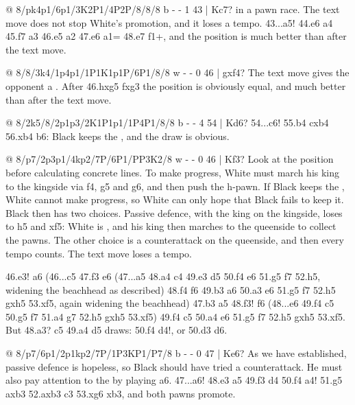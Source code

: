 @ 8/pk4p1/6p1/3K2P1/4P2P/8/8/8 b - - 1 43 | Kc7?
 in a pawn race.
The text move does not stop White's promotion, and it loses a tempo. 43...a5! 44.\K e6 a4 45.\K f7 a3
46.e5 a2 47.e6 a1=\Q{} 48.e7 \Q f1+, and the position is much better than after the text move.

@ 8/8/3k4/1p4p1/1P1K1p1P/6P1/8/8 w - - 0 46 | gxf4?
The text move gives the opponent a .
After 46.hxg5 fxg3 the position is obviously equal, and much better than after the text
move.

@ 8/2k5/8/2p1p3/2K1P1p1/1P4P1/8/8 b - - 4 54 | Kd6?
54...\K c6! 55.b4 cxb4 56.\K xb4 \K b6: Black keeps the ,
and the draw is obvious.

@ 8/p7/2p3p1/4kp2/7P/6P1/PP3K2/8 w - - 0 46 | Kf3?
Look at the position before calculating concrete lines. To make progress, White must march his king
to the kingside via f4, g5 and g6, and then push the h-pawn. If Black keeps the
, White cannot make progress, so White can
only hope that Black fails to keep it. Black then has two choices. Passive defence, with the king on
the kingside, loses to h5 and \K xf5: White is
,
and his king then marches to the queenside to collect the pawns. The other choice is a counterattack
on the queenside, and then every tempo counts. The text move loses a tempo.

46.\K e3! a6 (46...c5 47.\K f3 \K e6 (47...a5 48.a4 c4 49.\K e3 \K d5 50.\K f4 \K e6 51.\K g5 \K f7
52.h5, widening the beachhead as described) 48.\K f4 \K f6 49.b3 a6 50.a3 \K e6 51.\K g5 \K f7 52.h5
gxh5 53.\K xf5, again widening the beachhead) 47.b3 a5 48.\K f3! \K f6 (48...\K e6 49.\K f4 c5
50.\K g5 \K f7 51.a4 \K g7 52.h5 gxh5 53.\K xf5) 49.\K f4 c5 50.a4 \K e6 51.\K g5 \K f7 52.h5 gxh5
53.\K xf5. But 48.a3? c5 49.a4 \K d5 draws: 50.\K f4 \K d4!, or 50.\K d3 \K d6.

@ 8/p7/6p1/2p1kp2/7P/1P3KP1/P7/8 b - - 0 47 | Ke6?
As we have established, passive defence is hopeless, so Black should have tried a counterattack. He
must also pay attention to the  by
playing a6. 47...a6! 48.\K e3 a5 49.\K f3 \K d4 50.\K f4 a4! 51.\K g5 axb3 52.axb3 \K c3 53.\K xg6
\K xb3, and both pawns promote.

